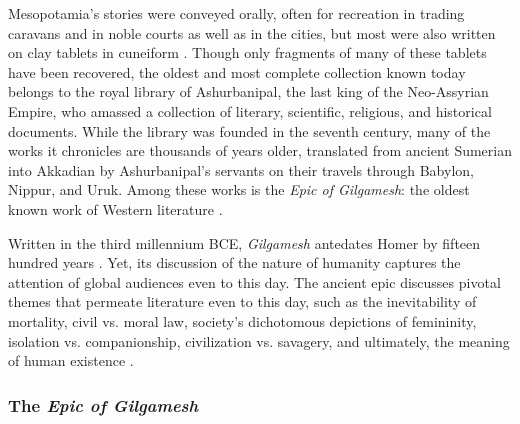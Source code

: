 \documentclass[10pt,a4paper]{article}
\begin{document}
Mesopotamia’s stories were conveyed orally, often for recreation in trading caravans and in noble courts as well as in the cities, but most were also written on clay tablets in cuneiform \cite{dalley2000myths}. Though only fragments of many of these tablets have been recovered, the oldest and most complete collection known today belongs to the royal library of Ashurbanipal, the last king of the Neo-Assyrian Empire, who amassed a collection of literary, scientific, religious, and historical documents. While the library was founded in the seventh century, many of the works it chronicles are thousands of years older, translated from ancient Sumerian into Akkadian by Ashurbanipal’s servants on their travels through Babylon, Nippur, and Uruk. Among these works is the \emph{Epic of Gilgamesh}: the oldest known work of Western literature \cite{sandars1972epic}.

Written in the third millennium BCE, \emph{Gilgamesh} antedates Homer by fifteen hundred years \cite{sandars1972epic}. Yet, its discussion of the nature of humanity captures the attention of global audiences even to this day. The ancient epic discusses pivotal themes that permeate literature even to this day, such as the inevitability of mortality, civil vs. moral law, society’s dichotomous depictions of femininity, isolation vs. companionship, civilization vs. savagery, and ultimately, the meaning of human existence \cite{snigowski2015}.

%
%
\subsubsection{The \emph{Epic of Gilgamesh}}
\end{document}
